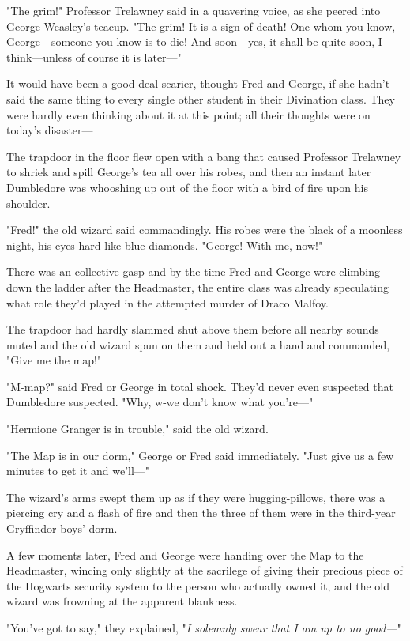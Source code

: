 "The grim!" Professor Trelawney said in a quavering voice, as she peered into
George Weasley's teacup. "The grim! It is a sign of death! One whom you know,
George—someone you know is to die! And soon—yes, it shall be quite soon, I
think—unless of course it is later—"

It would have been a good deal scarier, thought Fred and George, if she hadn't
said the same thing to every single other student in their Divination class.
They were hardly even thinking about it at this point; all their thoughts were
on today's disaster—

The trapdoor in the floor flew open with a bang that caused Professor Trelawney
to shriek and spill George's tea all over his robes, and then an instant later
Dumbledore was whooshing up out of the floor with a bird of fire upon his
shoulder.

"Fred!" the old wizard said commandingly. His robes were the black of a
moonless night, his eyes hard like blue diamonds. "George! With me, now!"

There was an collective gasp and by the time Fred and George were climbing down
the ladder after the Headmaster, the entire class was already speculating what
role they'd played in the attempted murder of Draco Malfoy.

The trapdoor had hardly slammed shut above them before all nearby sounds muted
and the old wizard spun on them and held out a hand and commanded, "Give me the
map!"

"M-map?" said Fred or George in total shock. They'd never even suspected that
Dumbledore suspected. "Why, w-we don't know what you're—"

"Hermione Granger is in trouble," said the old wizard.

"The Map is in our dorm," George or Fred said immediately. "Just give us a few
minutes to get it and we'll—"

The wizard's arms swept them up as if they were hugging-pillows, there was a
piercing cry and a flash of fire and then the three of them were in the
third-year Gryffindor boys' dorm.

A few moments later, Fred and George were handing over the Map to the
Headmaster, wincing only slightly at the sacrilege of giving their precious
piece of the Hogwarts security system to the person who actually owned it, and
the old wizard was frowning at the apparent blankness.

"You've got to say," they explained, "\emph{I solemnly swear that I am up to no
good—}"

